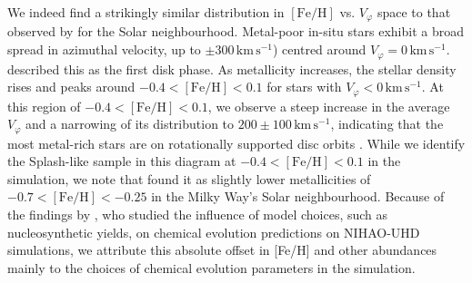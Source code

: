 \documentclass[fleqn,usenatbib]{mnras}
\begin{document}
We indeed find a strikingly similar distribution in $\mathrm{[Fe/H]}$ vs. $V_\varphi$ space to that observed by \citet{Belokurov2020} for the Solar neighbourhood. Metal-poor in-situ stars exhibit a broad spread in azimuthal velocity, up to $\pm 300\,\mathrm{km\,s^{-1}}$) centred around $V_\varphi = 0\,\mathrm{km\,s^{-1}}$. \citet{Chandra2024} described this as the first disk phase. As metallicity increases, the stellar density rises and peaks around $-0.4 < \mathrm{[Fe/H]} < 0.1$ for stars with $V_\varphi < 0\,\mathrm{km\,s^{-1}}$. At this region of $-0.4 < \mathrm{[Fe/H]} < 0.1$, we observe a steep increase in the average $V_\varphi$ \citep[the second phase according to][]{Chandra2024} and a narrowing of its distribution to $200 \pm 100\,\mathrm{km\,s^{-1}}$, indicating that the most metal-rich stars are on rotationally supported disc orbits \citep[the third phase in][]{Chandra2024}. While we identify the Splash-like sample in this diagram at $-0.4 < \mathrm{[Fe/H]} < 0.1$ in the simulation, we note that \citet{Belokurov2020} found it as slightly lower metallicities of $-0.7 < \mathrm{[Fe/H]} < -0.25$ in the Milky Way's Solar neighbourhood. Because of the findings by \citet{Buck2021}, who studied the influence of model choices, such as nucleosynthetic yields, on chemical evolution predictions on NIHAO-UHD simulations, we attribute this absolute offset in [Fe/H] and other abundances mainly to the choices of chemical evolution parameters in the simulation.
\end{document}
